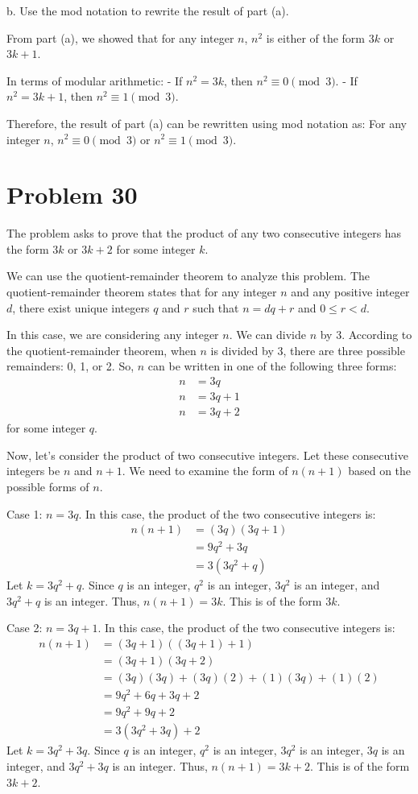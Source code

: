 \documentclass{article}
\begin{document}
b. Use the mod notation to rewrite the result of part (a).

From part (a), we showed that for any integer $n$, $n^2$ is either of the form $3k$ or $3k+1$.

In terms of modular arithmetic:
- If $n^2 = 3k$, then $n^2 \equiv 0 \pmod{3}$.
- If $n^2 = 3k+1$, then $n^2 \equiv 1 \pmod{3}$.

Therefore, the result of part (a) can be rewritten using mod notation as:
For any integer $n$, $n^2 \equiv 0 \pmod{3}$ or $n^2 \equiv 1 \pmod{3}$.

\newpage

\section*{Problem 30}
The problem asks to prove that the product of any two consecutive integers has the form $3k$ or $3k+2$ for some integer $k$.

We can use the quotient-remainder theorem to analyze this problem. The quotient-remainder theorem states that for any integer $n$ and any positive integer $d$, there exist unique integers $q$ and $r$ such that $n = dq + r$ and $0 \le r < d$.

In this case, we are considering any integer $n$. We can divide $n$ by 3. According to the quotient-remainder theorem, when $n$ is divided by 3, there are three possible remainders: 0, 1, or 2. So, $n$ can be written in one of the following three forms:
\begin{align*} n &= 3q \\ n &= 3q + 1 \\ n &= 3q + 2 \end{align*}
for some integer $q$.

Now, let's consider the product of two consecutive integers. Let these consecutive integers be $n$ and $n+1$. We need to examine the form of $n(n+1)$ based on the possible forms of $n$.

Case 1: $n = 3q$.
In this case, the product of the two consecutive integers is:
\begin{align*} n(n+1) &= (3q)(3q+1) \\ &= 9q^2 + 3q \\ &= 3(3q^2 + q) \end{align*}
Let $k = 3q^2 + q$. Since $q$ is an integer, $q^2$ is an integer, $3q^2$ is an integer, and $3q^2 + q$ is an integer.
Thus, $n(n+1) = 3k$. This is of the form $3k$.

Case 2: $n = 3q + 1$.
In this case, the product of the two consecutive integers is:
\begin{align*} n(n+1) &= (3q+1)((3q+1)+1) \\ &= (3q+1)(3q+2) \\ &= (3q)(3q) + (3q)(2) + (1)(3q) + (1)(2) \\ &= 9q^2 + 6q + 3q + 2 \\ &= 9q^2 + 9q + 2 \\ &= 3(3q^2 + 3q) + 2 \end{align*}
Let $k = 3q^2 + 3q$. Since $q$ is an integer, $q^2$ is an integer, $3q^2$ is an integer, $3q$ is an integer, and $3q^2 + 3q$ is an integer.
Thus, $n(n+1) = 3k + 2$. This is of the form $3k+2$.
\end{document}
